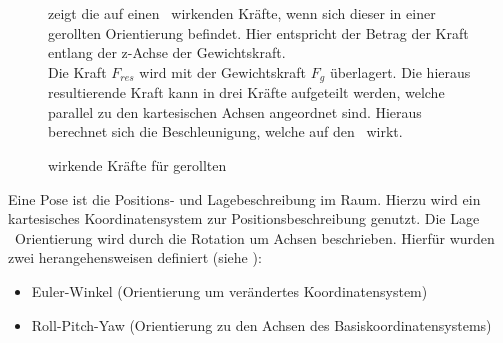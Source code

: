 \begin{figure}[ht!]
\vspace{0.25cm}
\begin{center}
\caption{wirkende Kräfte für gerollten \Quad\ }
\label{fig:ForcesRolled}
\end{center}

\vspace{0.25cm}
 zeigt die auf einen \Quad\ wirkenden Kräfte, wenn sich dieser in einer gerollten Orientierung befindet. Hier entspricht der Betrag der Kraft entlang der z-Achse der Gewichtskraft.\\
Die Kraft $F_{res}$ wird mit der Gewichtskraft $F_g$ überlagert. Die hieraus resultierende Kraft kann in drei Kräfte aufgeteilt werden, welche parallel zu den kartesischen Achsen angeordnet sind. Hieraus berechnet sich die Beschleunigung, welche auf den \Quad\ wirkt.
\end{figure}




Eine Pose ist die Positions- und Lagebeschreibung im Raum. Hierzu wird ein kartesisches Koordinatensystem zur Positionsbeschreibung genutzt. Die Lage \bzw\ Orientierung wird durch die Rotation um Achsen beschrieben. Hierfür wurden zwei herangehensweisen definiert (siehe \cite{VLRobo2-5}):
\begin{itemize}
\item Euler-Winkel (Orientierung um verändertes Koordinatensystem)
\item Roll-Pitch-Yaw (Orientierung zu den Achsen des Basiskoordinatensystems)
\end{itemize}

